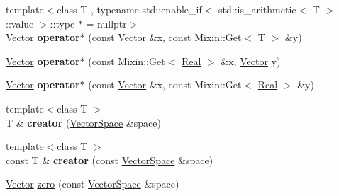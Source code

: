 \begin{DoxyCompactItemize}
\item 
\hypertarget{namespaceSpacy_a6656b636307ec4d5552477027b724f46}{{\footnotesize template$<$class T , typename std\-::enable\-\_\-if$<$ std\-::is\-\_\-arithmetic$<$ T $>$\-::value $>$\-::type $\ast$  = nullptr$>$ }\\\hyperlink{classSpacy_1_1Vector}{Vector} {\bfseries operator$\ast$} (const \hyperlink{classSpacy_1_1Vector}{Vector} \&x, const Mixin\-::\-Get$<$ T $>$ \&y)}\label{namespaceSpacy_a6656b636307ec4d5552477027b724f46}

\item 
\hypertarget{namespaceSpacy_a011c3af8fa33fc2da22f9667edaeba29}{\hyperlink{classSpacy_1_1Vector}{Vector} {\bfseries operator$\ast$} (const Mixin\-::\-Get$<$ \hyperlink{classSpacy_1_1Real}{Real} $>$ \&x, \hyperlink{classSpacy_1_1Vector}{Vector} y)}\label{namespaceSpacy_a011c3af8fa33fc2da22f9667edaeba29}

\item 
\hypertarget{namespaceSpacy_a7ad73bdbb0377bd088f1007894a4a824}{\hyperlink{classSpacy_1_1Vector}{Vector} {\bfseries operator$\ast$} (const \hyperlink{classSpacy_1_1Vector}{Vector} \&x, const Mixin\-::\-Get$<$ \hyperlink{classSpacy_1_1Real}{Real} $>$ \&y)}\label{namespaceSpacy_a7ad73bdbb0377bd088f1007894a4a824}

\item 
\hypertarget{namespaceSpacy_affaca762d59da675eef594854762cdcd}{{\footnotesize template$<$class T $>$ }\\T \& {\bfseries creator} (\hyperlink{classSpacy_1_1VectorSpace}{Vector\-Space} \&space)}\label{namespaceSpacy_affaca762d59da675eef594854762cdcd}

\item 
\hypertarget{namespaceSpacy_aed55e3a3401be0e74e174a12858baffa}{{\footnotesize template$<$class T $>$ }\\const T \& {\bfseries creator} (const \hyperlink{classSpacy_1_1VectorSpace}{Vector\-Space} \&space)}\label{namespaceSpacy_aed55e3a3401be0e74e174a12858baffa}

\item 
\hypertarget{namespaceSpacy_ac7f0661bfdb52144b9ff0b9bbdd81f69}{\hyperlink{classSpacy_1_1Vector}{Vector} \hyperlink{namespaceSpacy_ac7f0661bfdb52144b9ff0b9bbdd81f69}{zero} (const \hyperlink{classSpacy_1_1VectorSpace}{Vector\-Space} \&space)}\label{namespaceSpacy_ac7f0661bfdb52144b9ff0b9bbdd81f69}


\end{DoxyCompactItemize}
